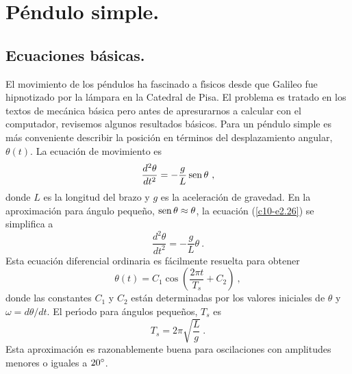\section{P{\'e}ndulo simple.}

\subsection{Ecuaciones b{\'a}sicas.}

El movimiento de los p{\'e}ndulos ha fascinado a f{\'\i}sicos desde que Galileo
fue hipnotizado por la l{\'a}mpara en la Catedral de Pisa. El problema es
tratado en los textos de mec{\'a}nica b{\'a}sica pero antes de apresurarnos a
calcular con el computador, revisemos algunos resultados b{\'a}sicos. Para
un p{\'e}ndulo simple es m{\'a}s conveniente describir la posici{\'o}n en t{\'e}rminos
del desplazamiento angular, $\theta(t)$. La ecuaci{\'o}n de movimiento es
\begin{equation}
\label{c10-e2.26}
\frac{d^2\theta}{dt^2}= - \frac{g}{L}\operatorname{sen} \theta\ ,
\end{equation}
donde $L$ es la longitud del brazo y $g$ es la aceleraci{\'o}n de
gravedad. En la aproximaci{\'o}n para {\'a}ngulo peque{\~n}o, $\operatorname{sen} \theta \approx \theta$, la
ecuaci{\'o}n (\ref{c10-e2.26}) se simplifica a
\begin{equation}
\label{c10-e2.27}
\frac{d^2\theta}{dt^2}= - \frac{g}{L}\theta\ .
\end{equation} 
Esta ecuaci{\'o}n diferencial ordinaria es f{\'a}cilmente resuelta para
obtener
\begin{equation}
\label{c10-e2.28}
\theta(t)=C_1\cos \left ( \frac{2\pi t}{T_s} + C_2 \right )\ ,
\end{equation}
donde las constantes $C_1$ y $C_2$ est{\'a}n determinadas por los valores
iniciales de $\theta$ y $\omega=d\theta/ dt$. El per{\'\i}odo para {\'a}ngulos peque{\~n}os,
$T_s$ es
\begin{equation}
\label{c10-e2.29}
T_s=2\pi\sqrt{\frac Lg}\ .
\end{equation}
Esta aproximaci{\'o}n es razonablemente buena para oscilaciones con
amplitudes menores o iguales a $20^\circ$.

